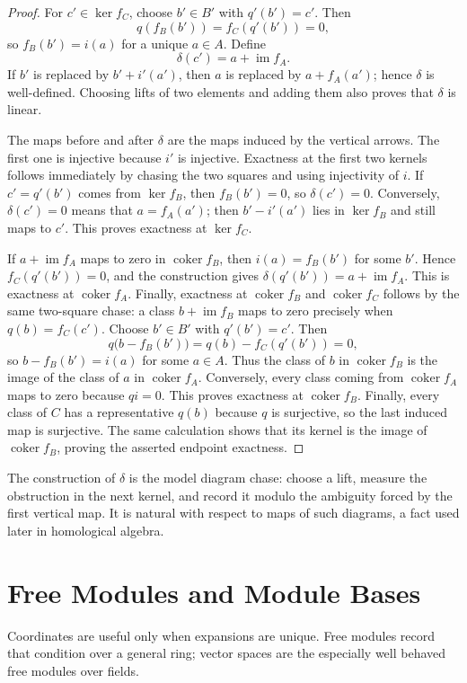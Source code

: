 \begin{proof}
For \(c'\in\ker f_C\), choose \(b'\in B'\) with \(q'(b')=c'\).  Then
\[
q(f_B(b'))=f_C(q'(b'))=0,
\]
so \(f_B(b')=i(a)\) for a unique \(a\in A\).  Define
\[
\delta(c')=a+\operatorname{im}f_A.
\]
If \(b'\) is replaced by \(b'+i'(a')\), then \(a\) is replaced by
\(a+f_A(a')\); hence \(\delta\) is well-defined.  Choosing lifts of two
elements and adding them also proves that \(\delta\) is linear.

The maps before and after \(\delta\) are the maps induced by the vertical
arrows.  The first one is injective because \(i'\) is injective.  Exactness
at the first two kernels follows immediately by chasing the two squares and
using injectivity of \(i\).  If \(c'=q'(b')\) comes from
\(\ker f_B\), then \(f_B(b')=0\), so \(\delta(c')=0\).  Conversely,
\(\delta(c')=0\) means that \(a=f_A(a')\); then
\(b'-i'(a')\) lies in \(\ker f_B\) and still maps to \(c'\).  This proves
exactness at \(\ker f_C\).

If \(a+\operatorname{im}f_A\) maps to zero in \(\operatorname{coker}f_B\),
then \(i(a)=f_B(b')\) for some \(b'\).  Hence
\(f_C(q'(b'))=0\), and the construction gives
\(\delta(q'(b'))=a+\operatorname{im}f_A\).  This is exactness at
\(\operatorname{coker}f_A\).  Finally, exactness at
\(\operatorname{coker}f_B\) and \(\operatorname{coker}f_C\) follows by the
same two-square chase: a class \(b+\operatorname{im}f_B\) maps to zero
precisely when \(q(b)=f_C(c')\).  Choose \(b'\in B'\) with \(q'(b')=c'\).
Then
\[
q\bigl(b-f_B(b')\bigr)=q(b)-f_C(q'(b'))=0,
\]
so \(b-f_B(b')=i(a)\) for some \(a\in A\).  Thus the class of \(b\) in
\(\operatorname{coker}f_B\) is the image of the class of \(a\) in
\(\operatorname{coker}f_A\).  Conversely, every class coming from
\(\operatorname{coker}f_A\) maps to zero because \(qi=0\).  This proves
exactness at \(\operatorname{coker}f_B\).  Finally, every class of \(C\)
has a representative \(q(b)\) because \(q\) is surjective, so the last
induced map is surjective.  The same calculation shows that its kernel is
the image of \(\operatorname{coker}f_B\), proving the asserted endpoint
exactness.
\end{proof}

The construction of \(\delta\) is the model diagram chase: choose a lift,
measure the obstruction in the next kernel, and record it modulo the
ambiguity forced by the first vertical map.  It is natural with respect to
maps of such diagrams, a fact used later in homological algebra.

\section{Free Modules and Module Bases}\label{sec:free-modules-bases}
Coordinates are useful only when expansions are unique. Free modules record
that condition over a general ring; vector spaces are the especially well
behaved free modules over fields.

